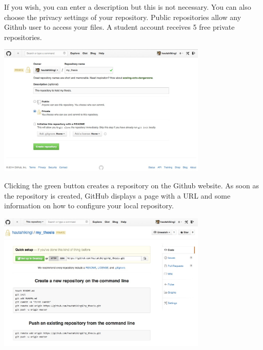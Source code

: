 \documentclass{article}
\begin{document}
If you wish, you can enter a description but this is not necessary. You can also choose the privacy settings of your repository. Public repositories allow any Github user to access your files. A student account receives 5 free private repositories.

\begin{center}
\includegraphics[width=10cm]{./auxfiles/Ghub1.jpg}
\end{center}

Clicking the green button creates a repository on the Github website. As soon as the repository is created, GitHub displays a page with a URL and some information on how to configure your local repository. 

\begin{center}
\includegraphics[width=10cm]{./auxfiles/Ghub2.jpg}
\end{center}
\end{document}
